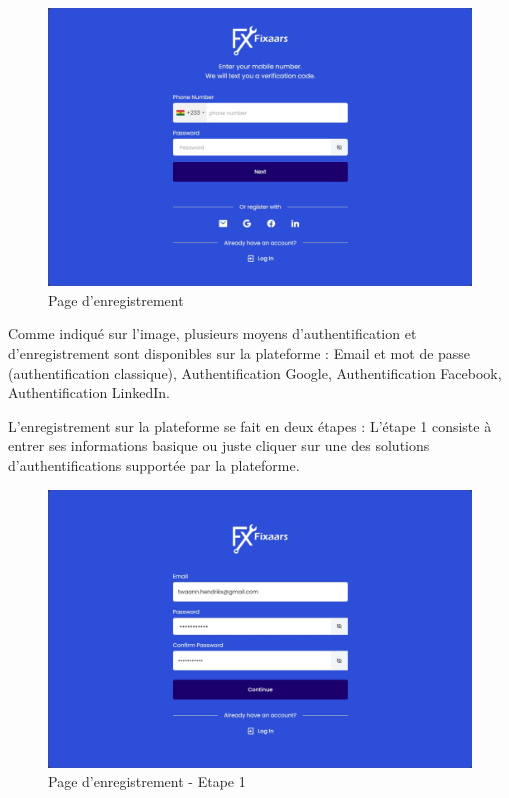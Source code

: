 \begin{figure}[H]
\begin{center}
\includegraphics[width=12cm]{assets/demo/signup.png}
\end{center}
\caption{Page d'enregistrement}
\end{figure}

Comme indiqué sur l'image, plusieurs moyens d'authentification et d'enregistrement sont disponibles sur la plateforme : Email et mot de passe (authentification classique), Authentification Google, Authentification Facebook, Authentification LinkedIn.

\vspace{0.35cm}

L'enregistrement sur la plateforme se fait en deux étapes : L'étape 1 consiste à entrer ses informations basique ou juste cliquer sur une des solutions d'authentifications supportée par la plateforme.

\begin{figure}[H]
\begin{center}
\includegraphics[width=12cm]{assets/demo/signup-email.png}
\end{center}
\caption{Page d'enregistrement - Etape 1}
\end{figure}

